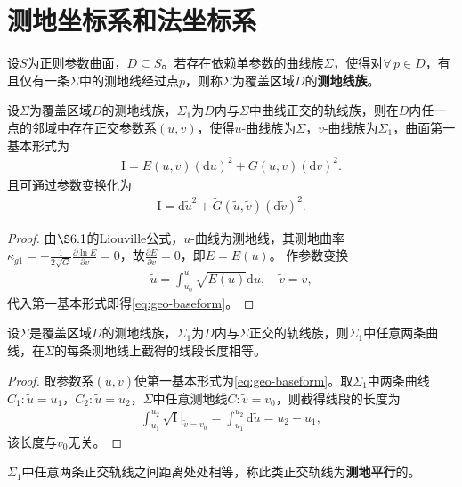 \documentclass[../../main.tex]{subfiles}%
\begin{document}
\section{测地坐标系和法坐标系}

\begin{definition}
设$S$为正则参数曲面，$D\subseteq S$。若存在依赖单参数的曲线族$\Sigma$，使得对$\forall\,p\in D$，有且仅有一条$\Sigma$中的测地线经过点$p$，则称$\Sigma$为覆盖区域$D$的\textbf{测地线族}。
\end{definition}

\begin{proposition}
设$\Sigma$为覆盖区域$D$的测地线族，$\Sigma_1$为$D$内与$\Sigma$中曲线正交的轨线族，则在$D$内任一点的邻域中存在正交参数系$(u,v)$，使得$u$-曲线族为$\Sigma$，$v$-曲线族为$\Sigma_1$，曲面第一基本形式为
\begin{align*}
\mathrm{I}=E(u,v)(\mathrm{d}u)^2+G(u,v)(\mathrm{d}v)^2.
\end{align*}
且可通过参数变换化为
\begin{align}
\mathrm{I}=\mathrm{d}\tilde{u}^2+\tilde{G}(\tilde{u},\tilde{v})(\mathrm{d}\tilde{v})^2.\label{eq:geo-baseform}
\end{align}
\end{proposition}
\begin{proof}

由$\S6.1$的Liouville公式，$u$-曲线为测地线，其测地曲率$\kappa_{g1}=-\frac{1}{2\sqrt{G}}\frac{\partial\ln E}{\partial v}=0$，故$\frac{\partial E}{\partial v}=0$，即$E=E(u)$。
作参数变换
\begin{align*}
\tilde{u}=\int_{u_0}^u\sqrt{E(u)}\mathrm{d}u,\quad \tilde{v}=v,
\end{align*}
代入第一基本形式即得\eqref{eq:geo-baseform}。

\end{proof}

\begin{theorem}
设$\Sigma$是覆盖区域$D$的测地线族，$\Sigma_1$为$D$内与$\Sigma$正交的轨线族，则$\Sigma_1$中任意两条曲线，在$\Sigma$的每条测地线上截得的线段长度相等。
\end{theorem}
\begin{proof}

取参数系$(\tilde{u},\tilde{v})$使第一基本形式为\eqref{eq:geo-baseform}。取$\Sigma_1$中两条曲线$C_1:\tilde{u}=u_1$，$C_2:\tilde{u}=u_2$，$\Sigma$中任意测地线$C:\tilde{v}=v_0$，则截得线段的长度为
\begin{align*}
\int_{u_1}^{u_2}\sqrt{\mathrm{I}}\bigg|_{\tilde{v}=v_0}=\int_{u_1}^{u_2}\mathrm{d}\tilde{u}=u_2-u_1,
\end{align*}
该长度与$v_0$无关。

\end{proof}
\begin{remark}
$\Sigma_1$中任意两条正交轨线之间距离处处相等，称此类正交轨线为\textbf{测地平行}的。
\end{remark}
\end{document}
